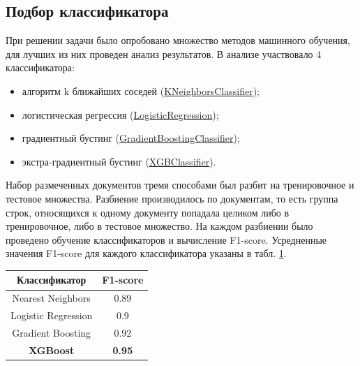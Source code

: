 \documentclass{ProcISPRAS}
\begin{document}
\subsection{Подбор классификатора}

При решении задачи было опробовано множество методов машинного обучения, для лучших из них проведен анализ результатов. В анализе участвовало 4 классификатора:

\begin{itemize}

  \item алгоритм k ближайших соседей (\href{https://scikit-learn.org/stable/modules/generated/sklearn.neighbors.KNeighborsClassifier.html}{KNeighborsClassifier});
  \item логистическая регрессия (\href{https://scikit-learn.org/stable/modules/generated/sklearn.linear_model.LogisticRegression.html}{LogisticRegression});
  \item градиентный бустинг (\href{https://scikit-learn.org/stable/modules/generated/sklearn.ensemble.GradientBoostingClassifier.html}{GradientBoostingClassifier});
  \item экстра-градиентный бустинг (\href{https://xgboost.readthedocs.io/en/latest/}{XGBClassifier}).

\end{itemize}

Набор размеченных документов тремя способами был разбит на тренировочное и тестовое множества. Разбиение производилось по документам, то есть группа строк, относящихся к одному документу попадала целиком либо в тренировочное, либо в тестовое множество. На каждом разбиении было проведено обучение классификаторов и вычисление F1-score. Усредненные значения F1-score для каждого классификатора указаны в табл. \ref{tab:classifier_comparison}.
\begin{table}[ht]
\begin{tabular}{cc}
 \toprule
    \textbf{Классификатор} & \textbf{F1-score} \\
    \midrule
        Nearest Neighbors & 0.89 \\
        Logistic Regression & 0.9 \\
        Gradient Boosting & 0.92 \\
        \bf XGBoost & \bf 0.95 \\
    \bottomrule
    \end{tabular}
    \label{tab:classifier_comparison}
\end{table}
\end{document}
